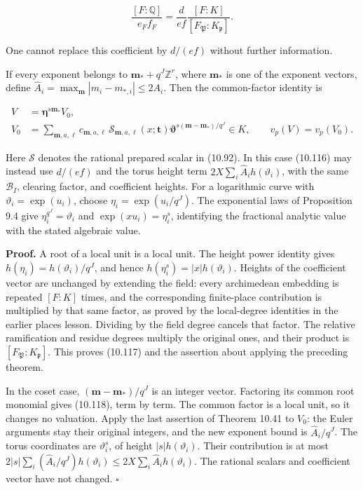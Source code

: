 \documentclass[
  11pt,
  a4paper,
]{article}
\begin{document}
\[
\frac{[F:\mathbb Q]}{e_Ff_F}
=\frac d{ef}\frac{[F:K]}{[F_{\mathfrak P}:K_{\mathfrak p}]}.
\tag{10.117}
\]

One cannot replace this coefficient by \(d/(ef)\) without further
information.

If every exponent belongs to \(\boldsymbol m_*+q^J\mathbb Z^r\), where
\(\boldsymbol m_*\) is one of the exponent vectors, define
\(\widehat A_i=\max_{\boldsymbol m}|m_i-m_{*,i}|\le2A_i\). Then the
common-factor identity is

\[
\begin{aligned}
V&=\boldsymbol\eta^{s\boldsymbol m_*}V_0,\\
V_0&=\sum_{\boldsymbol m,a,\ell}
c_{\boldsymbol m,a,\ell}\,\mathcal S_{\boldsymbol m,a,\ell}(x;\boldsymbol t)
\boldsymbol\vartheta^{s(\boldsymbol m-\boldsymbol m_*)/q^J}\in K,
\qquad v_p(V)=v_p(V_0).
\end{aligned}
\tag{10.118}
\]

Here \(\mathcal S\) denotes the rational prepared scalar in (10.92). In
this case (10.116) may instead use \(d/(ef)\) and the torus height term
\(2X\sum_i\widehat A_i h(\vartheta_i)\), with the same \(\mathcal B_I\),
clearing factor, and coefficient heights. For a logarithmic curve with
\(\vartheta_i=\exp(u_i)\), choose \(\eta_i=\exp(u_i/q^J)\). The
exponential laws of Proposition 9.4 give \(\eta_i^{q^J}=\vartheta_i\)
and \(\exp(xu_i)=\eta_i^s\), identifying the fractional analytic value
with the stated algebraic value.

\textbf{Proof.} A root of a local unit is a local unit. The height power
identity gives \(h(\eta_i)=h(\vartheta_i)/q^J\), and hence
\(h(\eta_i^s)=|x|h(\vartheta_i)\). Heights of the coefficient vector are
unchanged by extending the field: every archimedean embedding is
repeated \([F:K]\) times, and the corresponding finite-place
contribution is multiplied by that same factor, as proved by the
local-degree identities in the earlier places lesson. Dividing by the
field degree cancels that factor. The relative ramification and residue
degrees multiply the original ones, and their product is
\([F_{\mathfrak P}:K_{\mathfrak p}]\). This proves (10.117) and the
assertion about applying the preceding theorem.

In the coset case, \((\boldsymbol m-\boldsymbol m_*)/q^J\) is an integer
vector. Factoring its common root monomial gives (10.118), term by term.
The common factor is a local unit, so it changes no valuation. Apply the
last assertion of Theorem 10.41 to \(V_0\): the Euler arguments stay
their original integers, and the new exponent bound is
\(\widehat A_i/q^J\). The torus coordinates are \(\vartheta_i^s\), of
height \(|s|h(\vartheta_i)\). Their contribution is at most
\(2|s|\sum_i(\widehat A_i/q^J)h(\vartheta_i)\le2X\sum_i\widehat A_i h(\vartheta_i)\).
The rational scalars and coefficient vector have not changed.
\(\square\)
\end{document}

